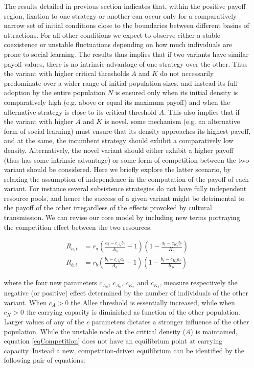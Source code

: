 \documentclass[review,authoryear]{elsarticle}
\begin{document}
The results detailed in previous section indicates that, within the positive payoff region, fixation to one strategy or another can occur only for a comparatively narrow set of initial conditions close to the boundaries between different basins of attractions. For all other conditions we expect to observe either a stable coexistence or unstable fluctuations depending on how much individuals are prone to social learning. The results thus implies that if two variants have similar payoff values, there is no intrinsic advantage of one strategy over the other. Thus the variant with higher critical thresholds $A$ and $K$ do not necessarily predominate over a wider range of initial population sizes, and instead its full adoption by the entire population $N$ is ensured only when its initial density is comparatively high (e.g. above or equal its maximum payoff) and when the alternative strategy is close to its critical threshold $A$. This also implies that if the variant with higher $A$ and $K$ is novel, some mechanism (e.g. an alternative form of social learning) must ensure that its density approaches its highest payoff, and at the same, the incumbent strategy should exhibit a comparatively low density. Alternatively, the novel variant should either exhibit a higher payoff (thus has some intrinsic advantage) or some form of competition between the two variant should be considered. Here we briefly explore the latter scenario, by relaxing the assumption of independence in the computation of the payoff of each variant. For instance several subsistence strategies do not have fully independent resource pools, and hence the success of a given variant might be detrimental to the payoff of the other irregardless of the effects provoked by cultural transmission. We can revise our core model by including new terms portraying the competition effect between the two resources:  

\begin{equation}
\begin{aligned}
R_{a,t}& = r_a (\frac{a_t-c_{A_a}b_t}{A_a}-1)(1-\frac{a_t-c_{K_a}b_t}{K_a})\\
R_{b,t}& = r_b (\frac{b_t-c_{A_b}a_t}{A_b}-1)(1-\frac{b_t-c_{K_b}a_t}{K_b}) 
\label{eqCompetition}
\end{aligned}
\end{equation}

where the four new parameters $c_{A_a}$, $c_{A_b}$, $c_{K_a}$ and $c_{K_b}$, measure respectively the negative (or positive) effect determined by the number of individuals of the other variant. 
When $c_{A}>0$ the Allee threshold is essentially increased, while when $c_{K}>0$ the carrying capacity is diminished as function of the other population. 
Larger values of any of the $c$ parameters dictates a stronger influence of the other population. While the unstable node at the critical density ($A$) is maintained, equation \ref{eqCompetition} does not have an equilibrium point at carrying capacity. Instead a new, competition-driven equilibrium can be identified by the following pair of equations: 
\end{document}
